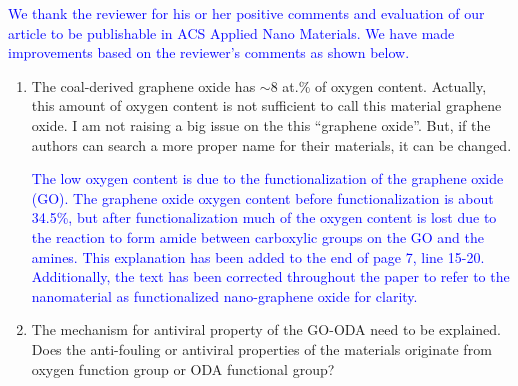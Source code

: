 \documentclass[12pt]{letter}
\newcommand{\blue}[1]{\textcolor{blue}{#1}} %
\begin{document}
\blue{We thank the reviewer for his or her positive comments and evaluation of our article to be publishable in ACS Applied Nano Materials.
We have made improvements based on the reviewer's comments as shown below.}



\begin{enumerate}
\item The coal-derived graphene oxide has $\sim$8 at.\% of oxygen content. Actually, this amount of oxygen content is not sufficient to call this material graphene oxide. I am not raising a big issue on the this “graphene oxide”. But, if the authors can search a more proper name for their materials, it can be changed.

\blue{The low oxygen content is due to the functionalization of the graphene oxide (GO). The graphene oxide oxygen content before functionalization is about 34.5\%, but after functionalization much of the oxygen content is lost due to the reaction to form amide between carboxylic groups on the GO and the amines.
This explanation has been added to the end of page 7, line 15-20. 
Additionally, the text has been corrected throughout the paper to refer to the nanomaterial as functionalized nano-graphene oxide for clarity.}


\item The mechanism for antiviral property of the GO-ODA need to be explained. Does the anti-fouling or antiviral properties of the materials originate from oxygen function group or ODA functional group?


\end{enumerate}
\end{document}
